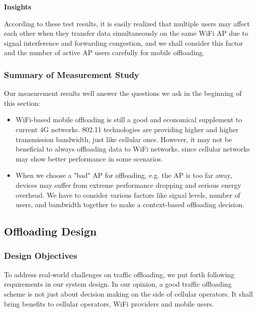 \documentclass[english]{tktltiki}
\begin{document}
\vspace{1mm}

\textbf{Insights}

\vspace{1mm}

According to these test results, it is easily realized that multiple users may affect each other when they transfer data simultaneously on the same WiFi AP due to signal interference and forwarding congestion, and we shall consider this factor and the number of active AP users carefully for mobile offloading.


\subsubsection{Summary of Measurement Study}

Our measurement results well answer the questions we ask in the beginning of this section: 

\begin{itemize}
  \item WiFi-based mobile offloading is still a good and economical supplement to current 4G networks. 802.11 technologies are providing higher and higher transmission bandwidth, just like cellular ones. However, it may not be beneficial to always offloading data to WiFi networks, since cellular networks may show better performance in some scenarios.
  \item When we choose a "bad" AP for offloading, e.g. the AP is too far away, devices may suffer from extreme performance dropping and serious energy overhead. We have to consider various factors like signal levels, number of users, and bandwidth together to make a context-based offloading decision.
\end{itemize}


\subsection{Offloading Design}


\subsubsection{Design Objectives}

To address real-world challenges on traffic offloading, we put forth following requirements in our system design. In our opinion, a good traffic offloading scheme is not just about decision making on the side of cellular operators. It shall bring benefits to cellular operators, WiFi providers and mobile users.
\end{document}

